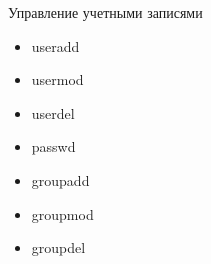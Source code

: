 \begin{frame}[fragile]{Управление учетными записями}
  \begin{itemize} 
    \item useradd
    \item usermod
    \item userdel
    \item passwd
    \item groupadd
    \item groupmod
    \item groupdel
  \end{itemize}
\end{frame}
